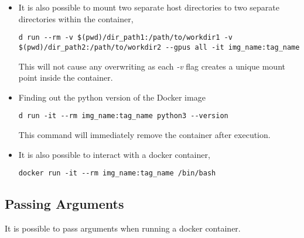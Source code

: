 \documentclass[12pt, a4paper]{scrbook}
\numberwithin{equation}{section}
\theoremstyle{definition}
\theoremstyle{definition}
\begin{document}
\begin{itemize}
		\item It is also possible to mount two separate host directories to two separate directories within the container,
		
		\begin{lstlisting}[style=mystylebash, label=alg:docker_run__mount_sev_dir_rm, xleftmargin=\parindent]
			d run --rm -v $(pwd)/dir_path1:/path/to/workdir1 -v $(pwd)/dir_path2:/path/to/workdir2 --gpus all -it img_name:tag_name
		\end{lstlisting}
		
		This will not cause any overwriting as each \textit{-v} flag creates a unique mount point inside the container. 
		
		\item Finding out the python version of the Docker image
		
		\begin{lstlisting}[style=mystylebash, label=alg:docker__python_version, xleftmargin=\parindent]
			d run -it --rm img_name:tag_name python3 --version
		\end{lstlisting}
		
		This command will immediately remove the container after execution. 
		
		\item It is also possible to interact with a docker container,
		
		\begin{lstlisting}[style=mystylebash, label=alg:docker_interactive_bash, xleftmargin=\parindent]
			docker run -it --rm img_name:tag_name /bin/bash
		\end{lstlisting}
		
	\end{itemize}
	
	\subsection{Passing Arguments}
	
	It is possible to pass arguments when running a docker container. 
	
\end{document}
